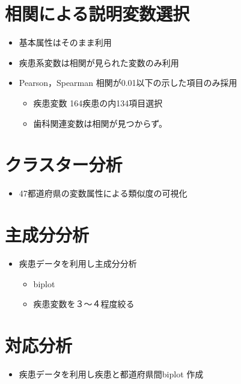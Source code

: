 \section{相関による説明変数選択}
\begin{itemize} \setlength{\itemsep}{-0.5mm} \setlength{\parskip}{-0.5mm}
	\item 基本属性はそのまま利用
	\item 疾患系変数は相関が見られた変数のみ利用
	\item Pearson，Spearman 相関が0.01以下の示した項目のみ採用
	      \begin{itemize}
		      \item 疾患変数 164疾患の内134項目選択
		      \item 歯科関連変数は相関が見つからず。
	      \end{itemize}
\end{itemize}


\section{クラスター分析}
\begin{itemize} \setlength{\itemsep}{-0.5mm} \setlength{\parskip}{-0.5mm}
	\item 47都道府県の変数属性による類似度の可視化
\end{itemize}


\section{主成分分析}
\begin{itemize} \setlength{\itemsep}{-0.5mm} \setlength{\parskip}{-0.5mm}
	\item 疾患データを利用し主成分分析
	      \begin{itemize} \setlength{\itemsep}{-0.5mm} \setlength{\parskip}{-0.5mm}
		      \item biplot
		      \item 疾患変数を３〜４程度絞る
	      \end{itemize}
\end{itemize}


\section{対応分析}
\begin{itemize} \setlength{\itemsep}{-0.5mm} \setlength{\parskip}{-0.5mm}
	\item 疾患データを利用し疾患と都道府県間biplot 作成
\end{itemize}


